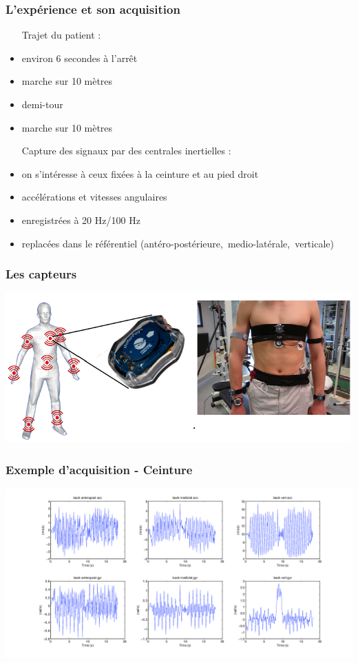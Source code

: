 \documentclass{beamer}
\begin{document}
\begin{frame}
	\frametitle{L'expérience et son acquisition}
	\begin{itemize}
		\item[Trajet] du patient : 
		\item environ 6 secondes à l'arrêt
		\item marche sur 10 mètres
		\item demi-tour
		\item marche sur 10 mètres

		\item[Capture] des signaux par des centrales inertielles : 
		\item on s'intéresse à ceux fixées à la ceinture et au pied droit
		\item accélérations et vitesses angulaires
		\item enregistrées à 20 Hz/100 Hz
		\item replacées dans le référentiel \mbox{(antéro-postérieure, medio-latérale, verticale)}
	\end{itemize}
\end{frame}

\begin{frame}
	\frametitle{Les capteurs}

		\hspace*{-1.3cm}\includegraphics[scale=1.9]{capteurs.eps}

\end{frame}

\begin{frame}
	\frametitle{Exemple d'acquisition - Ceinture}

			\hspace*{-2.75cm}\includegraphics[scale=0.40]{examplevisuback}

\end{frame}
\end{document}
